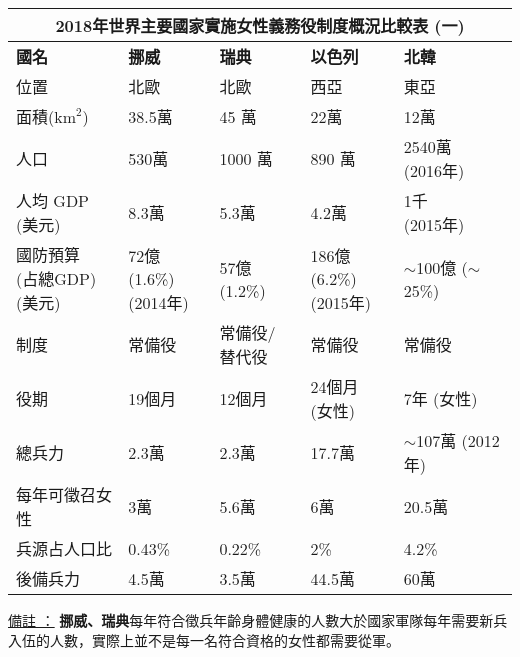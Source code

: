 \documentclass[a4paper,14pt]{extarticle}
\theoremstyle{plain}
\theoremstyle{remark}
\numberwithin{equation}{section}
\begin{document}
\begin{itemize}
\begin{center}
  \begin{tabularx}{\textwidth}{| X | X | X | X | X |}
   \hline
   \multicolumn{5}{|c|}{\textbf{2018年世界主要國家實施女性義務役制度概況比較表 (一)}}
 \\ \hline
  \textbf{國名} & \textbf{挪威} & \textbf{瑞典} & \textbf{以色列} & \textbf{北韓} 
  \\ \hline
  位置 & 北歐 & 北歐 & 西亞 & 東亞 
  \\
  \hline
  面積($\mathrm{km}^2$) & 38.5萬 & 45 萬 & 22萬 & 12萬 
  \\ 
  \hline
  人口 & 530萬 & 1000 萬 & 890 萬 & \parbox{3cm}{2540萬\\ (2016年)}
  \\ \hline
  \parbox{2.7cm}{人均  GDP \\ (美元)} & 8.3萬& 5.3萬& 4.2萬 & \parbox{3cm}{1千 \\(2015年)}
  \\ \hline
  \parbox{2.7cm}{國防預算 \\(占總GDP) \\ (美元)} & \parbox{3cm}{72億 (1.6\%)\\(2014年)} & 57億 (1.2\%) & \parbox{3cm}{186億(6.2\%) \\ (2015年)} & \parbox{3cm}{$\sim$100億 \\ ($\sim$25\%) }
  \\ \hline
  制度 & 常備役 & \parbox{3cm}{常備役/ \\ 替代役} & 常備役 & 常備役 
  \\ \hline
  役期 & 19個月 & 12個月 & \parbox{3cm}{24個月 \\(女性)} & 7年 (女性) 
  \\ \hline 
  總兵力 & 2.3萬 & 2.3萬 & 17.7萬 & \parbox{3cm}{$\sim$107萬\\ (2012年)}
  \\ \hline 
  每年可徵召女性 & 3萬 & 5.6萬 & 6萬 & 20.5萬 
  \\ \hline
  兵源占人口比 & 0.43\% & 0.22\% & 2\% & 4.2\%
  \\ \hline 
  後備兵力 & 4.5萬 & 3.5萬 & 44.5萬 & 60萬 
   \\ \hline
\end{tabularx}
\end{center}

\underline{備註 ：} \textbf{挪威、瑞典}每年符合徵兵年齡身體健康的人數大於國家軍隊每年需要新兵入伍的人數，實際上並不是每一名符合資格的女性都需要從軍。


\end{itemize}
\end{document}
